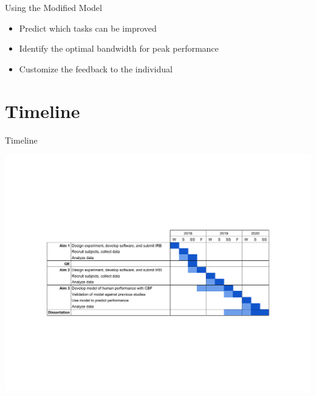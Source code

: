 \documentclass[10pt]{beamer}
\begin{document}
\begin{frame}[fragile]{Using the Modified Model}
  \begin{itemize}
    \setlength\itemsep{1em}
    \item Predict which tasks can be improved
    \item Identify the optimal bandwidth for peak performance
    \item Customize the feedback to the individual
  \end{itemize}
\end{frame}

\section{Timeline}

\begin{frame}[fragile]{Timeline}
  \begin{center}
    \includegraphics[trim={3.5cm 5cm 3.5cm 5cm},clip,width=\linewidth]{../img/timeline.pdf}
  \end{center}
\end{frame}
\end{document}
